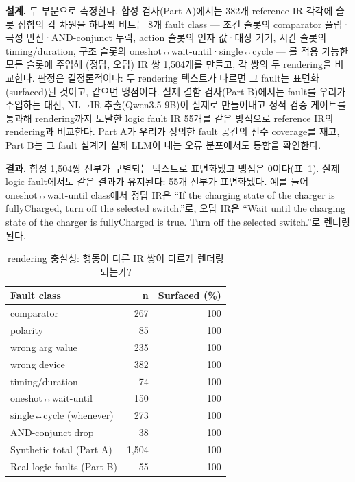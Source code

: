 \documentclass[sigconf,nonacm,anonymous,review]{acmart}
\begin{document}
\textbf{설계.} 두 부분으로 측정한다. 합성 검사(Part A)에서는 382개 reference IR 각각에 슬롯 집합의 각 차원을 하나씩 비트는 8개 fault class — 조건 슬롯의 comparator 플립·극성 반전·AND-conjunct 누락, action 슬롯의 인자 값·대상 기기, 시간 슬롯의 timing/duration, 구조 슬롯의 oneshot↔wait-until·single↔cycle — 를 적용 가능한 모든 슬롯에 주입해 (정답, 오답) IR 쌍 1,504개를 만들고, 각 쌍의 두 rendering을 비교한다. 판정은 결정론적이다: 두 rendering 텍스트가 다르면 그 fault는 표면화(surfaced)된 것이고, 같으면 맹점이다. 실제 결함 검사(Part B)에서는 fault를 우리가 주입하는 대신, NL→IR 추출(Qwen3.5-9B)이 실제로 만들어내고 정적 검증 게이트를 통과해 rendering까지 도달한 logic fault IR 55개를 같은 방식으로 reference IR의 rendering과 비교한다. Part A가 우리가 정의한 fault 공간의 전수 coverage를 재고, Part B는 그 fault 설계가 실제 LLM이 내는 오류 분포에서도 통함을 확인한다.

\textbf{결과.} 합성 1,504쌍 전부가 구별되는 텍스트로 표면화됐고 맹점은 0이다(표~\ref{tab:faithful}). 실제 logic fault에서도 같은 결과가 유지된다: 55개 전부가 표면화됐다. 예를 들어 oneshot↔wait-until class에서 정답 IR은 ``If the charging state of the charger is fullyCharged, turn off the selected switch.''로, 오답 IR은 ``Wait until the charging state of the charger is fullyCharged is true. Turn off the selected switch.''로 렌더링된다.

\begin{table}[t]
\centering
\caption{rendering 충실성: 행동이 다른 IR 쌍이 다르게 렌더링되는가?}
\label{tab:faithful}
\small
\begin{tabular}{lrr}
\toprule
Fault class & n & Surfaced (\%) \\
\midrule
comparator                & 267 & 100 \\
polarity                  & 85  & 100 \\
wrong arg value           & 235 & 100 \\
wrong device              & 382 & 100 \\
timing/duration           & 74  & 100 \\
oneshot↔wait-until        & 150 & 100 \\
single↔cycle (whenever)   & 273 & 100 \\
AND-conjunct drop         & 38  & 100 \\
\midrule
Synthetic total (Part A)   & 1,504 & 100 \\
Real logic faults (Part B) & 55  & 100 \\
\bottomrule
\end{tabular}
\end{table}
\end{document}

